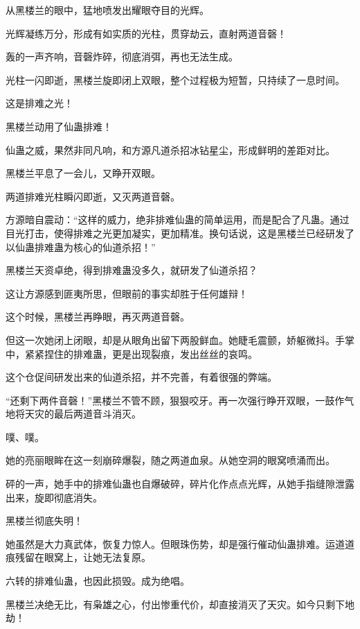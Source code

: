 
\begin{this_body}

从黑楼兰的眼中，猛地喷发出耀眼夺目的光辉。

光辉凝练万分，形成有如实质的光柱，贯穿劫云，直射两道音磬！

轰的一声齐响，音磬炸碎，彻底消弭，再也无法生成。

光柱一闪即逝，黑楼兰旋即闭上双眼，整个过程极为短暂，只持续了一息时间。

这是排难之光！

黑楼兰动用了仙蛊排难！

仙蛊之威，果然非同凡响，和方源凡道杀招冰钻星尘，形成鲜明的差距对比。

黑楼兰平息了一会儿，又睁开双眼。

两道排难光柱瞬闪即逝，又灭两道音磬。

方源暗自震动：“这样的威力，绝非排难仙蛊的简单运用，而是配合了凡蛊。通过目光打击，使得排难之光更加凝实，更加精准。换句话说，这是黑楼兰已经研发了以仙蛊排难蛊为核心的仙道杀招！”

黑楼兰天资卓绝，得到排难蛊没多久，就研发了仙道杀招？

这让方源感到匪夷所思，但眼前的事实却胜于任何雄辩！

这个时候，黑楼兰再睁眼，再灭两道音磬。

但这一次她闭上闭眼，却是从眼角出留下两股鲜血。她睫毛震颤，娇躯微抖。手掌中，紧紧捏住的排难蛊，更是出现裂痕，发出丝丝的哀鸣。

这个仓促间研发出来的仙道杀招，并不完善，有着很强的弊端。

“还剩下两件音磬！”黑楼兰不管不顾，狠狠咬牙。再一次强行睁开双眼，一鼓作气地将天灾的最后两道音斗消灭。

噗、噗。

她的亮丽眼眸在这一刻崩碎爆裂，随之两道血泉。从她空洞的眼窝喷涌而出。

砰的一声，她手中的排难仙蛊也自爆破碎，碎片化作点点光辉，从她手指缝隙泄露出来，旋即彻底消失。

黑楼兰彻底失明！

她虽然是大力真武体，恢复力惊人。但眼珠伤势，却是强行催动仙蛊排难。运道道痕残留在眼窝上，让她无法复原。

六转的排难仙蛊，也因此损毁。成为绝唱。

黑楼兰决绝无比，有枭雄之心，付出惨重代价，却直接消灭了天灾。如今只剩下地劫！


\end{this_body}
